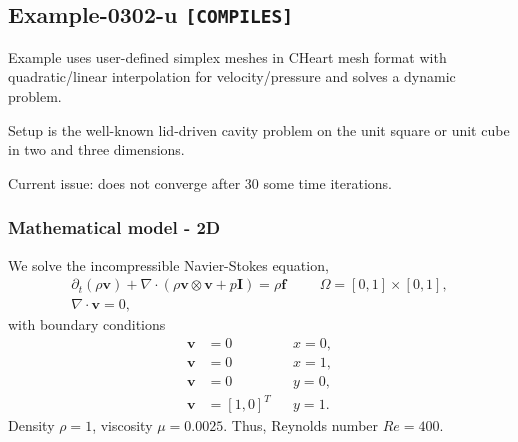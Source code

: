 %
\clearpage
%
\subsection{Example-0302-u \texttt{[COMPILES]}}
%
Example uses user-defined simplex meshes in CHeart mesh format with
quadratic/linear interpolation for velocity/pressure
and solves a dynamic problem.

Setup is the well-known lid-driven cavity problem
on the unit square or unit cube in two and three dimensions.

Current issue: does not converge after 30 some time iterations.
%
%
\subsubsection{Mathematical model - 2D}
%
We solve the incompressible Navier-Stokes equation,
%
\begin{align}
    \partial_{t} (\rho \boldsymbol{v}) + \nabla \cdot (\rho \boldsymbol{v} \otimes \boldsymbol{v} + p \boldsymbol{I}) = \rho \boldsymbol{f} & &&\Omega = [0, 1] \times [0, 1], \\
    \nabla \cdot \boldsymbol{v} = 0,
\end{align}
%
with boundary conditions
%
\begin{align}
    \boldsymbol{v} &= 0         &&x = 0, \\
    \boldsymbol{v} &= 0         &&x = 1, \\
    \boldsymbol{v} &= 0         &&y = 0, \\
    \boldsymbol{v} &= [1, 0]^T  &&y = 1.
\end{align}
%
Density $\rho = 1$, viscosity $\mu = 0.0025$. Thus, Reynolds number $Re = 400$.
%
%
